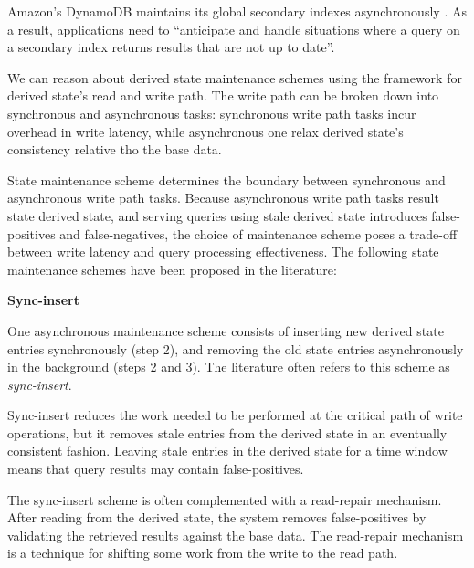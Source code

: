 Amazon's DynamoDB maintains its global secondary indexes asynchronously \cite{dynamodb:async}.
As a result,
applications need to ``anticipate and handle situations where a query on a secondary index returns results that are
not up to date''.

We can reason about derived state maintenance schemes using the framework for derived state's read and write path.
The write path can be broken down into synchronous and asynchronous tasks:
synchronous write path tasks incur overhead in write latency, while asynchronous one relax derived state's consistency
relative tho the base data.

State maintenance scheme determines the boundary between synchronous and asynchronous write path tasks.
Because asynchronous write path tasks result state derived state, and serving queries using stale derived state
introduces false-positives and false-negatives, the choice of maintenance scheme poses a trade-off between write latency
and query processing effectiveness.
The following state maintenance schemes have been proposed in the literature:





\bigskip
\noindent
\textbf{Sync-insert}

\noindent
One asynchronous maintenance scheme consists of inserting new derived state entries synchronously (step 2),
and removing the old state entries asynchronously in the background (steps 2 and 3).
The literature often refers to this scheme as \textit{sync-insert}.

Sync-insert reduces the work needed to be performed at the critical path of write operations,
but it removes stale entries from the derived state in an eventually consistent fashion.
Leaving stale entries in the derived state for a time window means that query results may contain false-positives.

The sync-insert scheme is often complemented with a read-repair mechanism.
After reading from the derived state, the system removes false-positives by validating the retrieved results against
the base data.
The read-repair mechanism is a technique for shifting some work from the write to the read path.

